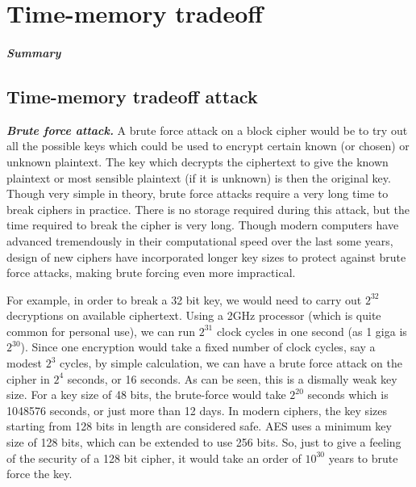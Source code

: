 \chapter{Time-memory tradeoff}

\paragraph{Summary}


\section{Time-memory tradeoff attack}

\textit{\textbf{Brute force attack.}} A brute force attack on a block cipher would be to try out all the possible keys which could be used to encrypt certain known (or chosen) or unknown plaintext. The key which decrypts the ciphertext to give the known plaintext or most sensible plaintext (if it is unknown) is then the original key. Though very simple in theory, brute force attacks require a very long time to break ciphers in practice. There is no storage required during this attack, but the time required to break the cipher is very long. Though modern computers have advanced tremendously in their computational speed over the last some years, design of new ciphers have incorporated longer key sizes to protect against brute force attacks, making brute forcing even more impractical.

For example, in order to break a 32 bit key, we would need to carry out $2^{32}$ decryptions on available ciphertext. Using a 2GHz processor (which is quite common for personal use), we can run $2^{31}$ clock cycles in one second (as 1 giga is $2^{30}$). Since one encryption would take a fixed number of clock cycles, say a modest $2^3$ cycles, by simple calculation, we can have a brute force attack on the cipher in $2^4$ seconds, or 16 seconds. As can be seen, this is a dismally weak key size. For a key size of 48 bits, the brute-force would take $2^{20}$ seconds which is 1048576 seconds, or just more than 12 days. In modern ciphers, the key sizes starting from 128 bits in length are considered safe. AES uses a minimum key size of 128 bits, which can be extended to use 256 bits. So, just to give a feeling of the security of a 128 bit cipher, it would take an order of $10^{30}$ years to brute force the key.\\

